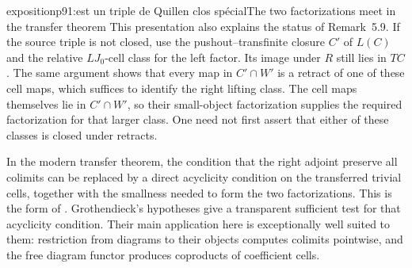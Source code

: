 \begin{dcomment}{exposition}{p91:est un triple de Quillen clos spécial}{The two factorizations meet in the transfer theorem}
This presentation also explains the status of Remark~5.9. If the source triple is not closed, use the pushout--transfinite closure $C'$ of $L(C)$ and the relative $LJ_0$-cell class for the left factor. Its image under $R$ still lies in $TC$. The same argument shows that every map in $C'\cap W'$ is a retract of one of these cell maps, which suffices to identify the right lifting class. The cell maps themselves lie in $C'\cap W'$, so their small-object factorization supplies the required factorization for that larger class. One need not first assert that either of these classes is closed under retracts.

In the modern transfer theorem, the condition that the right adjoint preserve all colimits can be replaced by a direct acyclicity condition on the transferred trivial cells, together with the smallness needed to form the two factorizations. This is the form of \citet[Theorem~11.3.2]{Hirschhorn2003}. Grothendieck's hypotheses give a transparent sufficient test for that acyclicity condition. Their main application here is exceptionally well suited to them: restriction from diagrams to their objects computes colimits pointwise, and the free diagram functor produces coproducts of coefficient cells.
\end{dcomment}

